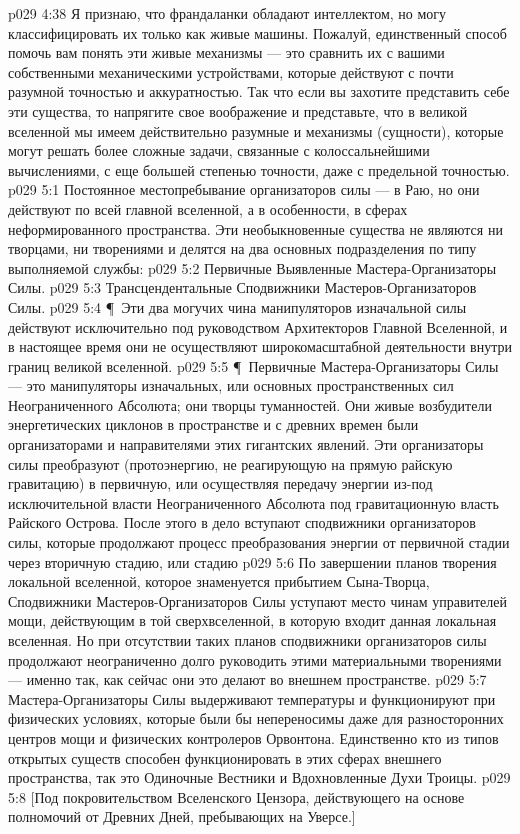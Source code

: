 \vs p029 4:38 Я признаю, что франдаланки обладают интеллектом, но могу классифицировать их только как живые машины. Пожалуй, единственный способ помочь вам понять эти живые механизмы --- это сравнить их с вашими собственными механическими устройствами, которые действуют с почти разумной точностью и аккуратностью. Так что если вы захотите представить себе эти существа, то напрягите свое воображение и представьте, что в великой вселенной мы имеем действительно разумные и  механизмы (сущности), которые могут решать более сложные задачи, связанные с колоссальнейшими вычислениями, с еще большей степенью точности, даже с предельной точностью.
\vs p029 5:1 Постоянное местопребывание организаторов силы --- в Раю, но они действуют по всей главной вселенной, а в особенности, в сферах неформированного пространства. Эти необыкновенные существа не являются ни творцами, ни творениями и делятся на два основных подразделения по типу выполняемой службы:
\vs p029 5:2 \bibnobreakspace Первичные Выявленные Мастера\hyp{}Организаторы Силы.
\vs p029 5:3 \bibnobreakspace Трансцендентальные Сподвижники Мастеров\hyp{}Организаторов Силы.
\vs p029 5:4 \P\ Эти два могучих чина манипуляторов изначальной силы действуют исключительно под руководством Архитекторов Главной Вселенной, и в настоящее время они не осуществляют широкомасштабной деятельности внутри границ великой вселенной.
\vs p029 5:5 \P\ Первичные Мастера\hyp{}Организаторы Силы --- это манипуляторы изначальных, или основных пространственных сил Неограниченного Абсолюта; они творцы туманностей. Они живые возбудители энергетических циклонов в пространстве и с древних времен были организаторами и направителями этих гигантских явлений. Эти организаторы силы преобразуют  (протоэнергию, не реагирующую на прямую райскую гравитацию) в первичную, или  осуществляя передачу энергии из\hyp{}под исключительной власти Неограниченного Абсолюта под гравитационную власть Райского Острова. После этого в дело вступают сподвижники организаторов силы, которые продолжают процесс преобразования энергии от первичной стадии через вторичную стадию, или стадию 
\vs p029 5:6 По завершении планов творения локальной вселенной, которое знаменуется прибытием Сына\hyp{}Творца, Сподвижники Мастеров\hyp{}Организаторов Силы уступают место чинам управителей мощи, действующим в той сверхвселенной, в которую входит данная локальная вселенная. Но при отсутствии таких планов сподвижники организаторов силы продолжают неограниченно долго руководить этими материальными творениями --- именно так, как сейчас они это делают во внешнем пространстве.
\vs p029 5:7 Мастера\hyp{}Организаторы Силы выдерживают температуры и функционируют при физических условиях, которые были бы непереносимы даже для разносторонних центров мощи и физических контролеров Орвонтона. Единственно кто из типов открытых существ способен функционировать в этих сферах внешнего пространства, так это Одиночные Вестники и Вдохновленные Духи Троицы.
\vs p029 5:8 [Под покровительством Вселенского Цензора, действующего на основе полномочий от Древних Дней, пребывающих на Уверсе.]

